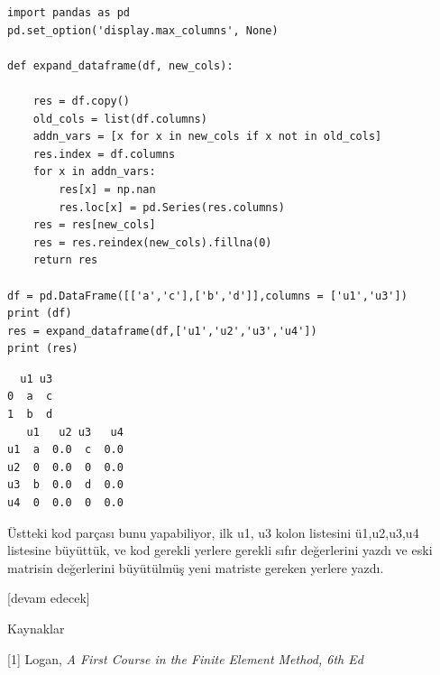 \documentclass[12pt,fleqn]{article}\usepackage{../../common}
\begin{document}
\begin{verbatim}
import pandas as pd
pd.set_option('display.max_columns', None)

def expand_dataframe(df, new_cols):

    res = df.copy()
    old_cols = list(df.columns)
    addn_vars = [x for x in new_cols if x not in old_cols]
    res.index = df.columns
    for x in addn_vars:
        res[x] = np.nan
        res.loc[x] = pd.Series(res.columns)
    res = res[new_cols]
    res = res.reindex(new_cols).fillna(0)
    return res

df = pd.DataFrame([['a','c'],['b','d']],columns = ['u1','u3'])
print (df)
res = expand_dataframe(df,['u1','u2','u3','u4'])
print (res)
\end{verbatim}

\begin{verbatim}
  u1 u3
0  a  c
1  b  d
   u1   u2 u3   u4
u1  a  0.0  c  0.0
u2  0  0.0  0  0.0
u3  b  0.0  d  0.0
u4  0  0.0  0  0.0
\end{verbatim}

Üstteki kod parçası bunu yapabiliyor, ilk u1, u3 kolon listesini ü1,u2,u3,u4
listesine büyüttük, ve kod gerekli yerlere gerekli sıfır değerlerini yazdı
ve eski matrisin değerlerini büyütülmüş yeni matriste gereken yerlere yazdı.














[devam edecek]

Kaynaklar

[1] Logan, {\em A First Course in the Finite Element Method, 6th Ed}
\end{document}
